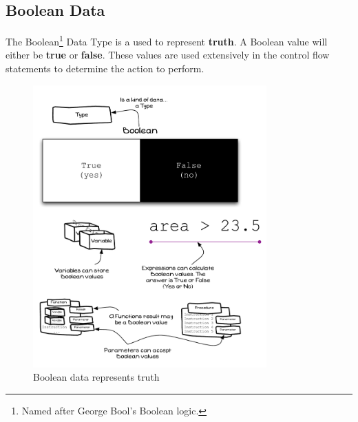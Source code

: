 \clearpage
\subsection{Boolean Data} %
\label{sub:boolean_data}

The Boolean\footnote{Named after George Bool's Boolean logic.} Data Type is a  used to represent \textbf{truth}. A Boolean value will either be \textbf{true} or \textbf{false}. These values are used extensively in the control flow statements to determine the action to perform.

\begin{figure}[h]
   \centering
   \includegraphics[width=0.8\textwidth]{./topics/control-flow/diagrams/BooleanData} 
   \caption{Boolean data represents truth}
   \label{fig:boolean-data}
\end{figure}


